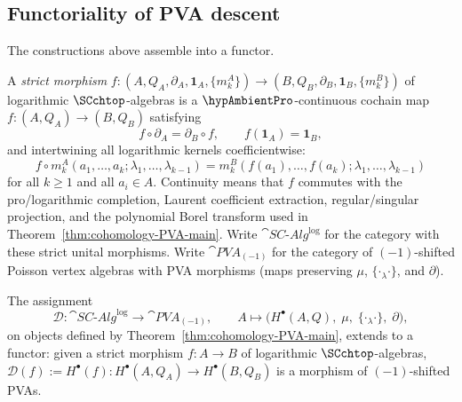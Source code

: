 \subsection{Functoriality of PVA descent}
\label{subsec:pva-functoriality}

The constructions above assemble into a functor.

\begin{definition}
\label{def:morphism-SC-algebra}
A \emph{strict morphism} $f \colon (A, Q_A, \partial_A,
\mathbf 1_A,\{m_k^A\})
\to (B, Q_B, \partial_B, \mathbf 1_B,\{m_k^B\})$ of logarithmic
$\SCchtop$-algebras is a $\hypAmbientPro$-continuous cochain map
$f \colon (A, Q_A) \to (B, Q_B)$
satisfying
\[
f\circ\partial_A=\partial_B\circ f,
\qquad
f(\mathbf 1_A)=\mathbf 1_B,
\]
and intertwining all logarithmic kernels coefficientwise:
\[
 f \circ m_k^A(a_1, \ldots, a_k; \lambda_1, \ldots, \lambda_{k-1})
 = m_k^B(f(a_1), \ldots, f(a_k); \lambda_1, \ldots, \lambda_{k-1})
\]
for all $k \geq 1$ and all $a_i \in A$.
Continuity means that $f$ commutes with the pro/logarithmic
completion, Laurent coefficient extraction, regular/singular
projection, and the polynomial Borel transform used in
Theorem~\textup{\ref{thm:cohomology-PVA-main}}.  Write
$\cat{SC\text{-}Alg}^{\log}$ for the category with these strict
unital morphisms.
Write $\cat{PVA}_{(-1)}$ for the category of
$(-1)$-shifted Poisson vertex algebras with PVA morphisms
(maps preserving $\mu$, $\{\cdot{}_\lambda\cdot\}$, and $\partial$).
\end{definition}

\begin{theorem}
\label{thm:pva-descent-functor}
The assignment
\[
 \mathcal{D} \colon \cat{SC\text{-}Alg}^{\log}
 \longrightarrow \cat{PVA}_{(-1)},
 \qquad
 A \longmapsto \bigl(H^\bullet(A,Q),\; \mu,\;
 \{\cdot{}_\lambda\cdot\},\; \partial\bigr),
\]
on objects defined by Theorem~\textup{\ref{thm:cohomology-PVA-main}},
extends to a functor: given a strict morphism
$f \colon A \to B$ of logarithmic $\SCchtop$-algebras,
$\mathcal{D}(f) := H^\bullet(f) \colon H^\bullet(A,Q_A) \to
H^\bullet(B,Q_B)$ is a morphism of $(-1)$-shifted PVAs.
\end{theorem}

